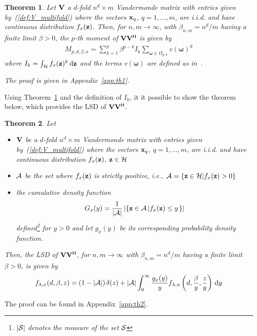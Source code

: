 \documentclass[11pt, draftcls, onecolumn, a4paper]{IEEEtran}
\newtheorem{theorem}{Theorem}[section]
\newcommand{\xv}{{\bf x}}
\newcommand{\zv}{{\bf z}}
\newcommand{\Vm}{{\bf V}}
\newcommand{\Ac}{{\cal A}}
\newcommand{\Hc}{{\cal H}}
\newcommand{\Sc}{{\cal S}}
\newcommand{\omegav}{\boldsymbol{\omega}}
\def\Herm{\mathsf{^H}}
\begin{document}
\begin{theorem}
\label{th:1}
Let $\Vm$ a $d$-fold $n^d\times m$ Vandermonde matrix with entries
given by~(\ref{def:V_multifold}) where the vectors $\xv_q$,
$q=1,\ldots,m$, are i.i.d. and have continuous distribution
$f_x(\zv)$.  Then, for $n,m\rightarrow \infty$, with $\beta_{n,m}=n^d/m$ 
having a finite limit $\beta>0$, 
the $p$-th moment of $\Vm\Vm\Herm$ is given by
\begin{eqnarray}
M_{p,d,\beta,x} = \sum_{k=1}^p \beta^{p-k} I_k \sum_{\omegav \in
  \Omega_{p,k}}v(\omegav)^d
\end{eqnarray}
where $I_k = \int_\Hc f_x(\zv)^k \dd \zv$ and the terms $v(\omegav)$
are defined as in~\cite{TSP2}. 

The proof is given in Appendix~\ref{app:th1}.
\end{theorem}

Using Theorem~\ref{th:1} and the definition of $I_k$, it it possible
to show the theorem below, which provides the LSD of $\Vm\Vm\Herm$.
\begin{theorem}
\label{th:2}
Let
\begin{itemize}
\item $\Vm$ be a $d$-fold $n^d\times m$ Vandermonde matrix with
  entries given by~(\ref{def:V_multifold}) where the vectors $\xv_q$,
  $q=1,\ldots,m$, are i.i.d. and have continuous distribution
  $f_x(\zv)$, $\zv \in \Hc$
\item $\Ac$ be the set where $f_x(\zv)$ is strictly positive,
  i.e., $\Ac = \left\{ \zv \in \Hc | f_x(\zv)>0 \right\}$ 
\item the cumulative density function
\begin{equation}
G_x(y) = \frac{1}{|\Ac|}\left|\left\{\zv \in \Ac \left|  f_x(\zv) \le y\right. \right\}\right|
\label{eq:G}
\end{equation}
defined\footnote{$|\Sc|$ denotes the measure of the set $\Sc$} for $y >0$ and
let $g_x(y)$ be its corresponding probability density function.
\end{itemize}
Then, the LSD of $\Vm\Vm\Herm$, for $n,m\rightarrow \infty$ with
$\beta_{n,m}=n^d/m$ having a finite limit $\beta>0$, is given by
\begin{equation}
f_{\lambda,x}(d,\beta,z) = \left(1-|\Ac|\right)\delta(z) + |\Ac|\int_0^{\infty}\frac{g_x(y)}{y}f_{\lambda,u}\left(d,\frac{\beta}{y},\frac{z}{y}\right)\dd y
\label{eq:th2}
\end{equation}
\end{theorem}
\begin{IEEEproof}
The proof can be found in Appendix~\ref{app:th2}.
\end{IEEEproof}
\end{document}
